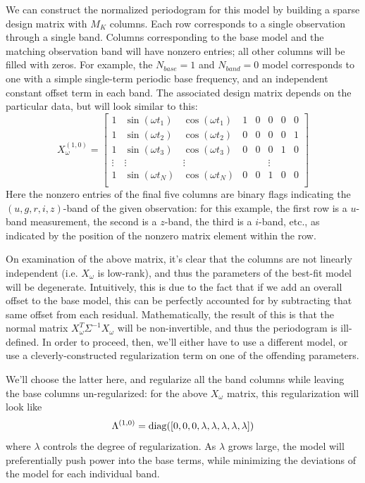 \documentclass{emulateapj}
\begin{document}
We can construct the normalized periodogram for this model by building a sparse design matrix with $M_K$ columns. Each row corresponds to a single observation through a single band. Columns corresponding to the base model and the matching observation band will have nonzero entries; all other columns will be filled with zeros. For example, the $N_{base}=1$ and $N_{band}=0$ model corresponds to one with a simple single-term periodic base frequency, and an independent constant offset term in each band. The associated design matrix depends on the particular data, but will look similar to this:
\begin{equation}
X_\omega^{(1,0)} = \left[
\begin{array}{cccccccc}
1 & \sin(\omega t_1) & \cos(\omega t_1) & 1 & 0 & 0 & 0 & 0\\
1 & \sin(\omega t_2) & \cos(\omega t_2) & 0 & 0 & 0 & 0 & 1\\
1 & \sin(\omega t_3) & \cos(\omega t_3) & 0 & 0 & 0 & 1 & 0\\
\vdots & \vdots & \vdots & & & \vdots & &\\
1 & \sin(\omega t_N) & \cos(\omega t_N) & 0 & 0 & 1 & 0 & 0\\
\end{array}
\right]
\end{equation}
Here the nonzero entries of the final five columns are binary flags indicating the $(u, g, r, i, z)$-band of the given observation: for this example, the first row is a $u$-band measurement, the second is a $z$-band, the third is a $i$-band, etc., as indicated by the position of the nonzero matrix element within the row.

On examination of the above matrix, it's clear that the columns are not linearly independent (i.e. $X_\omega$ is low-rank), and thus the parameters of the best-fit model will be degenerate. Intuitively, this is due to the fact that if we add an overall offset to the base model, this can be perfectly accounted for by subtracting that same offset from each residual. Mathematically, the result of this is that the normal matrix $X_\omega^T\Sigma^{-1}X_\omega$ will be non-invertible, and thus the periodogram is ill-defined. In order to proceed, then, we'll either have to use a different model, or use a cleverly-constructed regularization term on one of the offending parameters.

We'll choose the latter here, and regularize all the band columns while leaving the base columns un-regularized: for the above $X_\omega$ matrix, this regularization will look like
\begin{equation}
  \Lambda^{(1,0)} = {\rm diag}([0, 0, 0, \lambda, \lambda, \lambda, \lambda, \lambda])
\end{equation}
where $\lambda$ controls the degree of regularization. As $\lambda$ grows large, the model will preferentially push power into the base terms, while minimizing the deviations of the model for each individual band.
\end{document}
